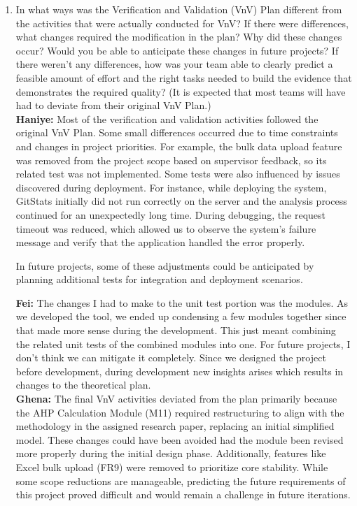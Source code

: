 \documentclass[12pt, titlepage]{article}
\begin{document}
\begin{enumerate}
  \item In what ways was the Verification and Validation (VnV) Plan different
  from the activities that were actually conducted for VnV?  If there were
  differences, what changes required the modification in the plan?  Why did
  these changes occur?  Would you be able to anticipate these changes in future
  projects?  If there weren't any differences, how was your team able to clearly
  predict a feasible amount of effort and the right tasks needed to build the
  evidence that demonstrates the required quality?  (It is expected that most
  teams will have had to deviate from their original VnV Plan.)\\

  \textbf{Haniye:} Most of the verification and validation activities followed
    the original VnV Plan. Some small differences occurred due to time
    constraints and changes in project priorities. For example, the bulk data
    upload feature was removed from the project scope based on supervisor
    feedback, so its related test was not implemented.
    Some tests were also influenced by issues discovered during deployment.
    For instance, while deploying the system, GitStats initially did not run
    correctly on the server and the analysis process continued for an
    unexpectedly long time. During debugging, the request timeout was reduced,
    which allowed us to observe the system’s failure message and verify that
    the application handled the error properly.

    In future projects, some of these adjustments could be anticipated by
    planning additional tests for integration and deployment scenarios.

  \textbf{Fei:} The changes I had to make to the unit test portion was the modules. As we developed the tool, we ended up condensing a few modules together since that made more sense during the development. This just meant combining the related unit tests of the combined modules into one. For future projects, I don't think we can mitigate it completely. Since we designed the project before development, during development new insights arises which results in changes to the theoretical plan.\\

  \textbf{Ghena:} The final VnV activities deviated from the plan primarily because the AHP Calculation Module (M11) required restructuring to align with the methodology in the assigned research paper, replacing an initial simplified model. These changes could have been avoided had the module been revised more properly during the initial design phase. Additionally, features like Excel bulk upload (FR9) were removed to prioritize core stability. While some scope reductions are manageable, predicting the future requirements of this project proved difficult and would remain a challenge in future iterations.


\end{enumerate}
\end{document}
